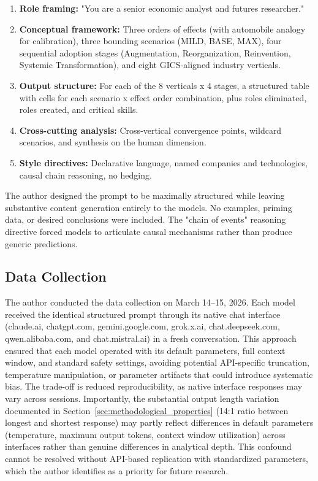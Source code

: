 \documentclass[preprint,review,12pt]{elsarticle}
\begin{document}
\begin{enumerate}
  \item \textbf{Role framing:} "You are a senior economic analyst and futures researcher."
  \item \textbf{Conceptual framework:} Three orders of effects (with automobile analogy for calibration), three bounding scenarios (MILD, BASE, MAX), four sequential adoption stages (Augmentation, Reorganization, Reinvention, Systemic Transformation), and eight GICS-aligned industry verticals.
  \item \textbf{Output structure:} For each of the 8 verticals x 4 stages, a structured table with cells for each scenario x effect order combination, plus roles eliminated, roles created, and critical skills.
  \item \textbf{Cross-cutting analysis:} Cross-vertical convergence points, wildcard scenarios, and synthesis on the human dimension.
  \item \textbf{Style directives:} Declarative language, named companies and technologies, causal chain reasoning, no hedging.

\end{enumerate}
The author designed the prompt to be maximally structured while leaving substantive content generation entirely to the models. No examples, priming data, or desired conclusions were included. The "chain of events" reasoning directive forced models to articulate causal mechanisms rather than produce generic predictions.


\subsection{Data Collection}
\label{sec:data_collection}

The author conducted the data collection on March 14--15, 2026. Each model received the identical structured prompt through its native chat interface (claude.ai, chatgpt.com, gemini.google.com, grok.x.ai, chat.deepseek.com, qwen.alibaba.com, and chat.mistral.ai) in a fresh conversation. This approach ensured that each model operated with its default parameters, full context window, and standard safety settings, avoiding potential API-specific truncation, temperature manipulation, or parameter artifacts that could introduce systematic bias. The trade-off is reduced reproducibility, as native interface responses may vary across sessions. Importantly, the substantial output length variation documented in Section~\ref{sec:methodological_properties} (14:1 ratio between longest and shortest response) may partly reflect differences in default parameters (temperature, maximum output tokens, context window utilization) across interfaces rather than genuine differences in analytical depth. This confound cannot be resolved without API-based replication with standardized parameters, which the author identifies as a priority for future research.
\end{document}
